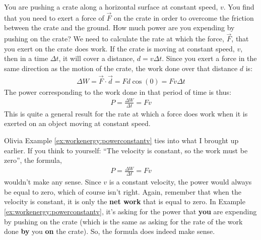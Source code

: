 \begin{example}{\label{ex:workenergy:powerconstantv}You are pushing a crate along a horizontal surface at constant speed, $v$. You find that you need to exert a force of $\vec F$ on the crate in order to overcome the friction between the crate and the ground. How much power are you expending by pushing on the crate?}
We need to calculate the rate at which the force, $\vec F$, that you exert on the crate does work. If the crate is moving at constant speed, $v$, then in a time $\Delta t$, it will cover a distance, $d=v\Delta t$. Since you exert a force in the same direction as the motion of the crate, the work done over that distance $d$ is:
\begin{align*}
\Delta W = \vec F \cdot \vec d = Fd\cos(0) = Fv\Delta t
\end{align*}
The power corresponding to the work done in that period of time is thus:
\begin{align*}
P = \frac{\Delta W}{\Delta t} = Fv
\end{align*}
This is quite a general result for the rate at which a force does work when it is exerted on an object moving at constant speed. 
\end{example}

\begin{studentOpinion}{Olivia} Example \ref{ex:workenergy:powerconstantv} ties into what I brought up earlier. If you think to yourself: ``The velocity is constant, so the work must be zero'', the formula,
\begin{align*}
P = \frac{\Delta W}{\Delta t} = Fv
\end{align*}
wouldn't make any sense. Since $v$ is a constant velocity, the power would always be equal to zero, which of course isn't right. Again, remember that when the velocity is constant, it is only the \textbf{net work} that is equal to zero. In Example \ref{ex:workenergy:powerconstantv}, it's asking for the power that \textbf{you} are expending by pushing on the crate (which is the same as asking for the rate of the work done \textbf{by} you \textbf{on} the crate). So, the formula does indeed make sense. 
\end{studentOpinion}


\newpage
